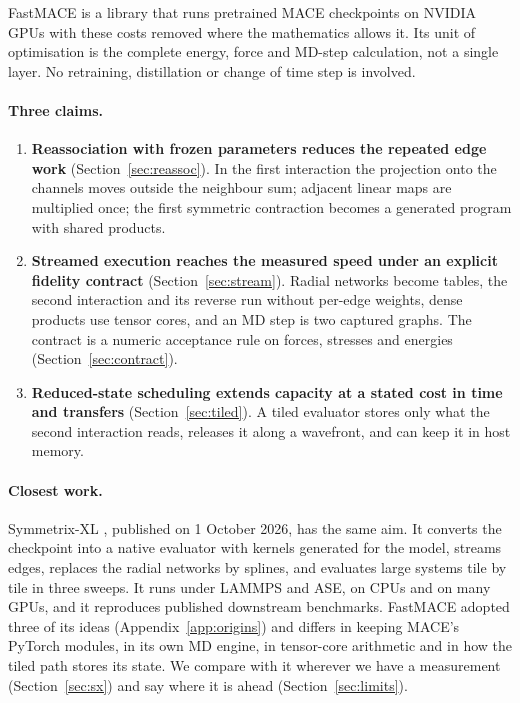 \documentclass[11pt]{article}
\begin{document}
FastMACE is a library that runs pretrained MACE checkpoints on NVIDIA GPUs with these costs removed where the
mathematics allows it. Its unit of optimisation is the complete energy, force and MD-step calculation, not a
single layer. No retraining, distillation or change of time step is involved.

\paragraph{Three claims.}
\begin{enumerate}\setlength{\itemsep}{0.1em}
\item \textbf{Reassociation with frozen parameters reduces the repeated edge work}
      (Section~\ref{sec:reassoc}). In the first interaction the projection onto the channels moves outside the
      neighbour sum; adjacent linear maps are multiplied once; the first symmetric contraction becomes a
      generated program with shared products.
\item \textbf{Streamed execution reaches the measured speed under an explicit fidelity contract}
      (Section~\ref{sec:stream}). Radial networks become tables, the second interaction and its reverse run
      without per-edge weights, dense products use tensor cores, and an MD step is two captured graphs. The
      contract is a numeric acceptance rule on forces, stresses and energies (Section~\ref{sec:contract}).
\item \textbf{Reduced-state scheduling extends capacity at a stated cost in time and transfers}
      (Section~\ref{sec:tiled}). A tiled evaluator stores only what the second interaction reads, releases it
      along a wavefront, and can keep it in host memory.
\end{enumerate}

\paragraph{Closest work.}
Symmetrix-XL \cite{fu2026symmetrixxl}, published on 1 October 2026, has the same aim. It converts the checkpoint
into a native evaluator with kernels generated for the model, streams edges, replaces the radial networks by
splines, and evaluates large systems tile by tile in three sweeps. It runs under LAMMPS and ASE, on CPUs and on
many GPUs, and it reproduces published downstream benchmarks. FastMACE adopted three of its ideas
(Appendix~\ref{app:origins}) and differs in keeping MACE's PyTorch modules, in its own MD engine, in tensor-core
arithmetic and in how the tiled path stores its state. We compare with it wherever we have a measurement
(Section~\ref{sec:sx}) and say where it is ahead (Section~\ref{sec:limits}).
\end{document}
